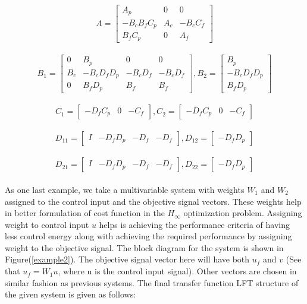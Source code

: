 \documentclass[a4paper,12pt]{article}
\begin{document}
				\[
				A =
				\begin{bmatrix}
				A_{p} & 0 & 0\\ -B_{c}B_{f}C_{p} & A_{c} & -B_{c}C_{f} \\ B_{f}C_{p} & 0 & A_{f}
				\end{bmatrix}
				\]	
				\\
				\[
				B_{1}=
				\begin{bmatrix}
				0 & B_{p} & 0 & 0 \\ B_{c} & -B_{c}D_{f}D_{p} & -B_{c}D_{f} & -B_{c}D_{f} \\
				0 & B_{f}D_{p} &  B_{f} & B_{f}
				\end{bmatrix}	
				,B_{2}=
				\begin{bmatrix}
				B_{p} \\ -B_{c}D_{f}D_{p} \\ B_{f}D_{p} 
				\end{bmatrix}	
				\]
				\\
				\[
				C_{1}=
				\begin{bmatrix}
				-D_{f}C_{p} & 0 & -C_{f}
				\end{bmatrix}	
				,C_{2}=
				\begin{bmatrix}
				-D_{f}C_{p} & 0 & -C_{f}
				\end{bmatrix}	
				\]	
				\\
				\[
				D_{11}=
				\begin{bmatrix}
				I & -D_{f}D_{p} & -D_{f} & -D_{f}
				\end{bmatrix}					
				,D_{12}=
				\begin{bmatrix}
				-D_{f}D_{p}
				\end{bmatrix}
				\]	
				\\
				\[	
				D_{21}=
				\begin{bmatrix}
				I & -D_{f}D_{p} & -D_{f} & -D_{f}
				\end{bmatrix}	
				,D_{22}=
				\begin{bmatrix}
				-D_{f}D_{p}
				\end{bmatrix}	
				\]
				\\
				As one last example, we take a multivariable system with weights $W_{1}$ and $W_{2}$ assigned to the control input and the objective signal vectors. These weights help in better formulation of cost function in the $H_{\infty}$ optimization problem. Assigning weight to control input $u$ helps is achieving the performance criteria of having less control energy along with achieving the required performance by assigning weight to the objective signal. The block diagram for the system is shown in Figure(\ref{example2}). The objective signal vector here will have both $u_{f}$ and $v$ (See that $u_{f}=W_{1}u$, where u is the control input signal). Other vectors are chosen in similar fashion as previous systems. The final transfer function LFT structure of the given system is given as follows:
\end{document}
